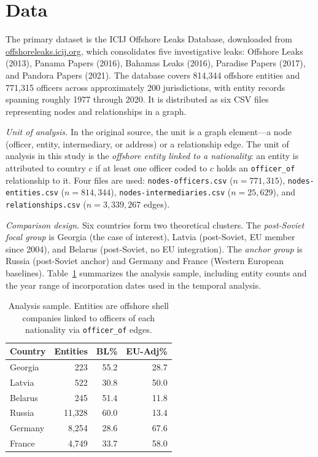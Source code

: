 \documentclass[9pt,twoside]{pnas-new}
\begin{document}
\section*{Data}

The primary dataset is the ICIJ Offshore Leaks Database, downloaded from \url{offshoreleaks.icij.org}, which consolidates five investigative leaks: Offshore Leaks (2013), Panama Papers (2016), Bahamas Leaks (2016), Paradise Papers (2017), and Pandora Papers (2021). The database covers 814,344 offshore entities and 771,315 officers across approximately 200 jurisdictions, with entity records spanning roughly 1977 through 2020. It is distributed as six CSV files representing nodes and relationships in a graph.

\textit{Unit of analysis.} In the original source, the unit is a graph element---a node (officer, entity, intermediary, or address) or a relationship edge. The unit of analysis in this study is the \textit{offshore entity linked to a nationality}: an entity is attributed to country $c$ if at least one officer coded to $c$ holds an \texttt{officer\_of} relationship to it. Four files are used: \texttt{nodes-officers.csv} ($n=771{,}315$), \texttt{nodes-entities.csv} ($n=814{,}344$), \texttt{nodes-intermediaries.csv} ($n=25{,}629$), and \texttt{relationships.csv} ($n=3{,}339{,}267$ edges).

\textit{Comparison design.} Six countries form two theoretical clusters. The \textit{post-Soviet focal group} is Georgia (the case of interest), Latvia (post-Soviet, EU member since 2004), and Belarus (post-Soviet, no EU integration). The \textit{anchor group} is Russia (post-Soviet anchor) and Germany and France (Western European baselines). Table~\ref{tab:sample} summarizes the analysis sample, including entity counts and the year range of incorporation dates used in the temporal analysis.

\begin{table}[h!]
\centering
\caption{Analysis sample. Entities are offshore shell companies linked to officers of each nationality via \texttt{officer\_of} edges.}
\label{tab:sample}
\begin{tabular}{lrrr}
Country & Entities & BL\% & EU-Adj\% \\
\midrule
Georgia  & 223    & 55.2 & 28.7 \\
Latvia   & 522    & 30.8 & 50.0 \\
Belarus  & 245    & 51.4 & 11.8 \\
Russia   & 11{,}328 & 60.0 & 13.4 \\
Germany  & 8{,}254  & 28.6 & 67.6 \\
France   & 4{,}749  & 33.7 & 58.0 \\
\bottomrule
\end{tabular}
\end{table}
\end{document}
